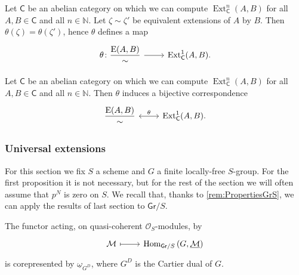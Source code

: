 \begin{lem}
	Let $\mathsf{C}$ be an abelian category on which we
	can compute $\operatorname{Ext}^n_{\mathsf{C}}(A,B)$
	for all $A, B \in \mathsf{C}$ and all $n \in \mathbb{N}$.
	Let $\zeta \sim \zeta'$ be equivalent extensions of
	$A$ by $B$.
	Then $\theta(\zeta) = \theta(\zeta')$, hence $\theta$
	defines a map
	\begin{equation*}
	\begin{tikzcd}[row sep = 0ex
		,/tikz/column 1/.append style={anchor=base east}
		,/tikz/column 2/.append style={anchor=base west}]
		\theta\colon \displaystyle{\frac{\mathrm{E}(A,B)}{\sim}} 
		\arrow[r, "", rightarrow] &
		\operatorname{Ext}^1_{\mathsf{C}}(A,B)
	.\end{tikzcd}
	\end{equation*} 
\end{lem} 


\begin{thm}\label{thm:CorrExt}
	Let $\mathsf{C}$ be an abelian category on which we
	can compute $\operatorname{Ext}^n_{\mathsf{C}}(A,B)$
	for all $A, B \in \mathsf{C}$ and all $n \in \mathbb{N}$.
	Then $\theta$ induces a bijective correspondence
	\begin{equation*}
	\begin{tikzcd}[row sep = 0ex
		,/tikz/column 1/.append style={anchor=base east}
		,/tikz/column 2/.append style={anchor=base west}]
		\displaystyle{\frac{\mathrm{E}(A,B)}{\sim}} 
		\arrow[r, "\theta", leftrightarrow] &
		\operatorname{Ext}^1_{\mathsf{C}}(A,B)
	.\end{tikzcd}
	\end{equation*} 
\end{thm} 



\subsubsection{Universal extensions}
For this section we fix $S$ a scheme and $G$ a finite locally-free $S$-group.
For the first proposition it is not necessary, but for the rest of the section we will often
assume that $p^N$ is zero on $S$.
We recall that, thanks to \cref{rem:PropertiesGrS},
we can apply the results of last section to $\mathsf{Gr}/S$.


\begin{prop}\label{prop:ReprhM}
	The functor acting, on quasi-coherent $\mathcal{O}_{ S }$-modules, by
	\begin{equation*}
	\begin{tikzcd}[row sep = 0ex
		,/tikz/column 1/.append style={anchor=base east}
		,/tikz/column 2/.append style={anchor=base west}]
		\mathcal{M} \arrow[r, "", mapsto] & 
		\Hom_{ \mathsf{Gr}/S } \left( G, \underline{\mathcal{M}} \right)
	\end{tikzcd}
	\end{equation*} 
	is corepresented by $\underline{\omega}_{G^D}$, where $G^D$ is
	the Cartier dual of $G$.
\end{prop}


